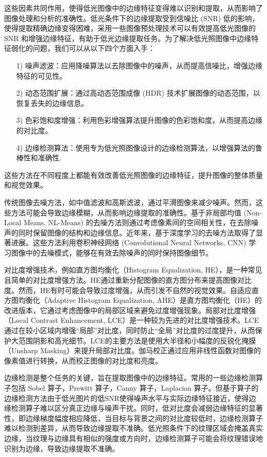 \documentclass[a4paper]{ctexart}
\begin{document}
	这些因素共同作用，使得低光图像中的边缘特征变得难以识别和提取，从而影响了图像处理和分析的准确性。低光条件下的边缘提取受到信噪比 (SNR) 低的影响，使得提取精确边缘变得困难，采用一些图像预处理技术可以有效提高低光图像的 SNR 和增强边缘特征，有助于低光边缘提取任务。为了解决低光照图像中边缘特征弱化的问题，我们可以从以下四个方面入手：
	
	\begin{itemize}
		\item[1)]
		噪声滤波：应用降噪算法以去除图像中的噪声，从而提高信噪比，增强边缘特征的可见性。
		\item[2)]
		动态范围扩展：通过高动态范围成像 (HDR) 技术扩展图像的动态范围，以恢复丢失的边缘信息。
		\item[3)]
		色彩饱和度增强：利用色彩增强算法提升图像的色彩饱和度，从而提高边缘的对比度。
		\item[4)]
		边缘检测算法：使用专为低光照图像设计的边缘检测算法，以增强算法的鲁棒性和准确性.
	\end{itemize}
	
	这些方法在不同程度上都能有效改善低光照图像的边缘特征，提升图像的整体质量和视觉效果。
	
	传统图像去噪方法，如中值滤波\cite{justusson2006median}和高斯滤波\cite{basu2002gaussian}，通过平滑图像来减少噪声。然而，这些方法可能会导致边缘模糊，从而影响边缘提取的准确性。基于非局部均值 (Non-Local Means, NL-Means) 的去噪方法\cite{wilson2013survey}则通过考虑像素间的空间相关性，在去除噪声的同时保留图像的结构和边缘信息。近年来，基于深度学习的去噪方法\cite{tian2020deep}取得了显著进展。这些方法利用卷积神经网络 (Convolutional Neural Networks, CNN) 学习图像中的去噪模式，能够在有效去除噪声的同时保持图像细节。
	
	对比度增强技术，例如直方图均衡化（Histogram Equalization, HE）\cite{stark2000adaptive}，是一种常见且简单的对比度增强方法。HE通过重新分配图像的直方图分布来提高图像对比度。然而，HE有时可能会导致过度增强，从而引发不自然的视觉效果。自适应直方图均衡化（Adaptive Histogram Equalization, AHE）\cite{ketcham1974image}是直方图均衡化（HE）的改进版本，它通过考虑图像中的局部区域来避免过度增强现象。局部对比度增强（Local Contrast Enhancement, LCE）是一种较为先进的对比度增强技术。LCE通过在较小区域内增强“局部”对比度，同时防止“全局”对比度的过度提升，从而保护大范围阴影和高光细节。LCE的主要方法是使用大半径和小幅度的反锐化掩膜（Unsharp Masking）来提升局部对比度。伽马校正通过应用非线性函数对图像的像素值进行转换，从而校正图像的对比度和亮度。
	
	边缘检测是整个任务的关键，旨在提取图像中的边缘特征。常用的一些边缘检测算子包括 Sobel 算子，Prewitt 算子，Canny 算子，Laplacian 算子。但基于算子的边缘检测方法由于低光图片的低SNR使得噪声水平与实际边缘特征接近，使得边缘检测算子难以区分真正边缘与噪声干扰。同时，低对比度会减弱边缘特征的显著性，即边缘梯度幅度相应降低，当目标与背景之间的对比度较低时，边缘检测算子难以检测到差异，从而导致边缘提取不准确。低光照条件下的纹理区域会掩盖真实边缘，当纹理与边缘具有相似的强度或方向时，边缘检测算子可能会将纹理错误地识别为边缘，导致边缘提取不准确。
	
\end{document}
